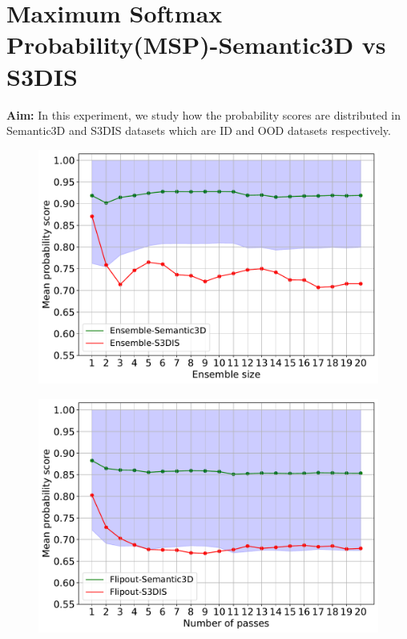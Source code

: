     \section{Maximum Softmax Probability(MSP)-Semantic3D vs S3DIS}
    \label{sec:prob_sem3dvs3dis}
    \textbf{Aim: } In this experiment, we study how the probability scores are distributed in Semantic3D and S3DIS datasets which are ID and OOD datasets respectively.
    \begin{figure}[h!]
        \centering
        \includegraphics[scale=0.55]{images/Ensemble_MSP.pdf}
        \caption{}
        \label{fig:prob_sem3dvs3dis_de}    
    \end{figure}
    \begin{figure}[h!]
        \centering
        \includegraphics[scale=0.55]{images/Flipout_MSP.pdf}
        \caption{}
        \label{fig:13_sem3dvs3dis}
    \end{figure}

